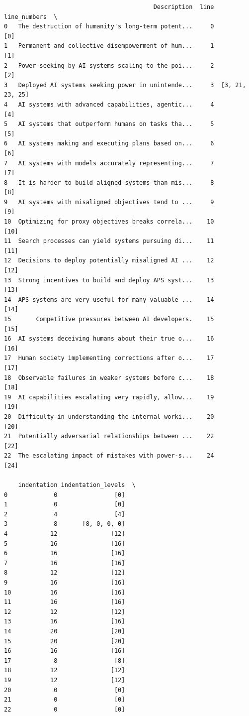 \documentclass[
  11pt,
  letterpaper,
]{book}
\begin{document}
\begin{verbatim}
                                          Description  line     line_numbers  \
0   The destruction of humanity's long-term potent...     0              [0]   
1   Permanent and collective disempowerment of hum...     1              [1]   
2   Power-seeking by AI systems scaling to the poi...     2              [2]   
3   Deployed AI systems seeking power in unintende...     3  [3, 21, 23, 25]   
4   AI systems with advanced capabilities, agentic...     4              [4]   
5   AI systems that outperform humans on tasks tha...     5              [5]   
6   AI systems making and executing plans based on...     6              [6]   
7   AI systems with models accurately representing...     7              [7]   
8   It is harder to build aligned systems than mis...     8              [8]   
9   AI systems with misaligned objectives tend to ...     9              [9]   
10  Optimizing for proxy objectives breaks correla...    10             [10]   
11  Search processes can yield systems pursuing di...    11             [11]   
12  Decisions to deploy potentially misaligned AI ...    12             [12]   
13  Strong incentives to build and deploy APS syst...    13             [13]   
14  APS systems are very useful for many valuable ...    14             [14]   
15       Competitive pressures between AI developers.    15             [15]   
16  AI systems deceiving humans about their true o...    16             [16]   
17  Human society implementing corrections after o...    17             [17]   
18  Observable failures in weaker systems before c...    18             [18]   
19  AI capabilities escalating very rapidly, allow...    19             [19]   
20  Difficulty in understanding the internal worki...    20             [20]   
21  Potentially adversarial relationships between ...    22             [22]   
22  The escalating impact of mistakes with power-s...    24             [24]   

    indentation indentation_levels  \
0             0                [0]   
1             0                [0]   
2             4                [4]   
3             8       [8, 0, 0, 0]   
4            12               [12]   
5            16               [16]   
6            16               [16]   
7            16               [16]   
8            12               [12]   
9            16               [16]   
10           16               [16]   
11           16               [16]   
12           12               [12]   
13           16               [16]   
14           20               [20]   
15           20               [20]   
16           16               [16]   
17            8                [8]   
18           12               [12]   
19           12               [12]   
20            0                [0]   
21            0                [0]   
22            0                [0]   


\end{verbatim}
\end{document}
